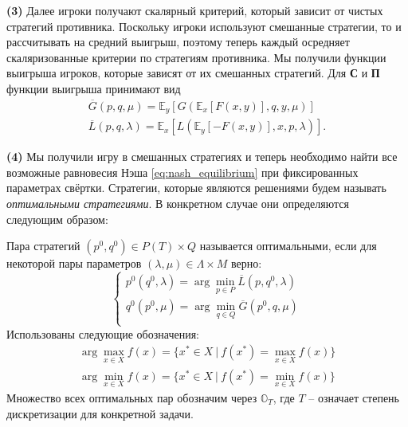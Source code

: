 \textbf{(3)}
Далее игроки получают скалярный критерий, который зависит от 
чистых стратегий противника. Поскольку игроки используют смешанные стратегии,
то и рассчитывать на средний выигрыш, поэтому
теперь каждый осредняет скаляризованные критерии по 
стратегиям противника. Мы получили функции выигрыша игроков, которые
зависят от их смешанных стратегий.
Для \textbf{С} и \textbf{П} функции выигрыша принимают вид 
\begin{gather*}
	\overline G(p, q, \mu) =
	\mathbb{E}_y [G(\mathbb{E}_x [F(x,y)], q, y, \mu)]
	\\
	\overline L(p, q, \lambda) = 
	\mathbb{E}_x [L(\mathbb{E}_y [-F(x,y)], x, p, \lambda)].
\end{gather*}

\textbf{(4)}
Мы получили игру в смешанных стратегиях и теперь
необходимо найти все возможные равновесия Нэша \eqref{eq:nash_equilibrium}
при фиксированных параметрах свёртки. 
Стратегии, которые являются решениями будем называть 
\textit{оптимальными стратегиями}. В конкретном случае они определяются
следующим образом:

\begin{Defenition}	
	Пара стратегий $(p^0, q^0) \in P(T) \times Q$
	называется оптимальными, если для некоторой пары параметров 
	$(\lambda, \mu) \in \Lambda \times M$ верно:
	\begin{equation}
		\begin{cases} 
			p^0(q^0, \lambda) = 
			\arg \min \limits_{p \in P} \overline L(p, q^0, \lambda) \\ 
			q^0(p^0, \mu) = 
			\arg \min \limits_{q \in Q} \overline G(p^0, q, \mu) \\
		\end{cases}
	\label{def:optimal_strategy}
	\end{equation}
Использованы следующие обозначения:
	\begin{gather*}
		\arg \max \limits_{x \in X} f(x) = 
		\{ x^* \in X \: | \: f(x^*) = \max \limits_{x \in X} f(x)\}
		\\
		\arg \min \limits_{x \in X} f(x) = 
		\{ x^* \in X \: | \: f(x^*) = \min \limits_{x \in X} f(x)\}
	\end{gather*}
	Множество всех оптимальных пар обозначим через $\mathbb{O}_T$,
	где $T$ -- означает степень дискретизации для конкретной задачи.
\end{Defenition}

